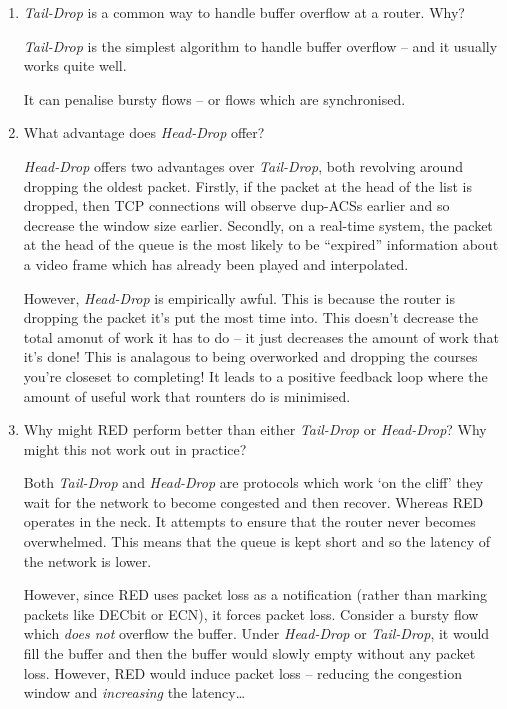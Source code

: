 \documentclass[10pt,\jkfside,a4paper]{article}
\newcommand{\td}{\textit{Tail-Drop}\xspace}
\newcommand{\hd}{\textit{Head-Drop}\xspace}
\begin{document}
\begin{enumerate}
\begin{enumerate}
        \item \td is a common way to handle buffer overflow at a router. Why?

        \td is the simplest algorithm to handle buffer overflow -- and it usually works quite well.

        It can penalise bursty flows -- or flows which are synchronised.

        \item What advantage does \hd offer?

        \hd offers two advantages over \td, both revolving around dropping the oldest packet. Firstly, if the packet at the head of the list is dropped, then TCP connections will observe dup-ACSs earlier and so decrease the window size earlier. Secondly, on a real-time system, the packet at the head of the queue is the most likely to be ``expired'' \ie information about a video frame which has already been played and interpolated.

        However, \hd is empirically awful. This is because the router is dropping the packet it's put the most time into. This doesn't decrease the total amonut of work it has to do -- it just decreases the amount of work that it's done! This is analagous to being overworked and dropping the courses you're closeset to completing! It leads to a positive feedback loop where the amount of useful work that rounters do is minimised.

        \item Why might RED perform better than either \td or \hd? Why might this not work out in practice?

        Both \td and \hd are protocols which work `on the cliff' \ie they wait for the network to become congested and then recover. Whereas RED operates in the neck. It attempts to ensure that the router never becomes overwhelmed. This means that the queue is kept short and so the latency of the network is lower.

        However, since RED uses packet loss as a notification (rather than marking packets like DECbit or ECN), it forces packet loss. Consider a bursty flow which \textit{does not} overflow the buffer. Under \hd or \td, it would fill the buffer and then the buffer would slowly empty without any packet loss. However, RED would induce packet loss -- reducing the congestion window and \textit{increasing} the latency\ldots

    \end{enumerate}

\end{enumerate}
\end{document}
